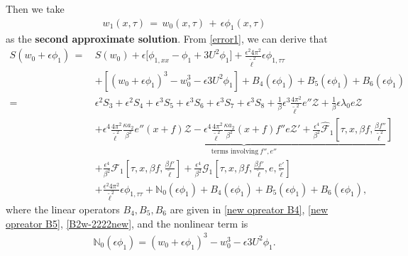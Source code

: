 \documentclass[10pt, reqno]{amsart}
\numberwithin{equation}{section}
\theoremstyle{definition}
\begin{document}
{{Then we take
\begin{align}\label{secondapproximatesolution}
w_1(x, \tau) \,=\, w_0(x, \tau)\,+\, \epsilon\phi_1(x, \tau)
\end{align}
as the {\bf{second approximate solution}}.
From \eqref{error1}, we can derive that
\begin{align}\label{sw1new}
S (w_0+ \epsilon\phi_1)
\,=\, &S(w_0) + \epsilon \Big[\phi_{1, xx} - \phi_1 +3 U^2\phi_1 \Big]
+ \frac{\epsilon^2 4\pi^2}{{\tilde\ell}^2} \epsilon\phi_{1, \tau\tau}
\nonumber\\[2mm]
& +\left[ \left( w_0+ \epsilon\phi_1\right)^3 -w_0^3 - \epsilon 3U^2 \phi_1 \right]
+ B_4(\epsilon\phi_1)+ B_5(\epsilon\phi_1)+ B_6(\epsilon\phi_1)
\nonumber\\[2mm]
=&
\epsilon^2 S_3+\epsilon^2 S_4 + \epsilon^3 S_5 + \epsilon^3 S_6
+\epsilon^3 S_7+\epsilon^3 S_8
+\frac1\beta\epsilon^3\frac{4\pi^2}{{\tilde\ell}^2} e''\mathcal Z
+ \frac1\beta \epsilon\lambda_0 e{\mathcal Z}
\nonumber\\[2mm]
&
 \underbrace{ +\epsilon^4 \frac{4\pi^2} {{\tilde\ell}^2} \frac{\kappa a_2}{\, \beta^2\, } e'' (x+f)\mathcal Z
 -\epsilon^4 \frac{ 4\pi^2} {{\tilde\ell}^2}  \frac{\kappa a_2 }{ \beta^2} (x+f) f'' e \mathcal Z' + \frac{\epsilon^4}{\beta^2} \hat{\mathcal F}_1\left[\tau, x, \beta f, \frac{\beta f''}{\tilde\ell^2} \right] }_{\text{terms involving}~f'', e''}
\nonumber\\[2mm]
 &
 + \frac{\epsilon^4}{\beta^2} \mathcal F_1\left[\tau, x, \beta f, \frac{\beta f'}{\tilde\ell}\right]
 +\frac{\epsilon^4} {\beta^2} \mathcal G_1\left[\tau, x, \beta f, \frac{\beta f'}{\tilde\ell}, e, \frac{e'}{\tilde\ell}\right]
\nonumber\\[2mm]
&+ \frac{\epsilon^2 4\pi^2}{{\tilde\ell}^2} \epsilon\phi_{1, \tau\tau}
+ \mathbb{N}_0(\epsilon\phi_1) + B_4(\epsilon\phi_1)+ B_5(\epsilon\phi_1)+ B_6(\epsilon\phi_1),
\end{align}
where the linear operators $ B_4, B_5, B_6 $ are given in \eqref{new opreator B4}, \eqref{new opreator B5}, \eqref{B2w-2222new},
and the nonlinear term is
\begin{align}\label{nonlinerarterm}
\mathbb{N}_0(\epsilon\phi_1)
=
\left( w_0+ \epsilon\phi_1\right)^3 -w_0^3 - \epsilon 3U^2 \phi_1.
\end{align}


}}
\end{document}
